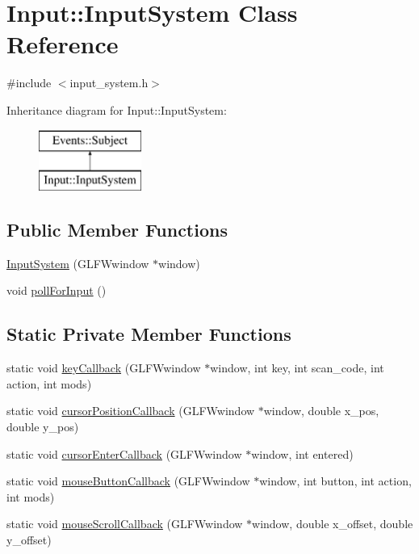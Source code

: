\hypertarget{class_input_1_1_input_system}{}\section{Input\+:\+:Input\+System Class Reference}
\label{class_input_1_1_input_system}


{\ttfamily \#include $<$input\+\_\+system.\+h$>$}

Inheritance diagram for Input\+:\+:Input\+System\+:\begin{figure}[H]
\begin{center}
\leavevmode
\includegraphics[height=2.000000cm]{class_input_1_1_input_system}
\end{center}
\end{figure}
\subsection*{Public Member Functions}
\begin{DoxyCompactItemize}
\item 
\hyperlink{class_input_1_1_input_system_aa754c4c6a976f808004a93dbcfcdb39e}{Input\+System} (G\+L\+F\+Wwindow $\ast$window)
\item 
void \hyperlink{class_input_1_1_input_system_a922d74d9c7b1d58785d58eb8187b90db}{poll\+For\+Input} ()
\end{DoxyCompactItemize}
\subsection*{Static Private Member Functions}
\begin{DoxyCompactItemize}
\item 
static void \hyperlink{class_input_1_1_input_system_a2a53f93797b351082ba88e65a76a59d3}{key\+Callback} (G\+L\+F\+Wwindow $\ast$window, int key, int scan\+\_\+code, int action, int mods)
\item 
static void \hyperlink{class_input_1_1_input_system_a25e317033e1c9932fca9a0f18bafba3e}{cursor\+Position\+Callback} (G\+L\+F\+Wwindow $\ast$window, double x\+\_\+pos, double y\+\_\+pos)
\item 
static void \hyperlink{class_input_1_1_input_system_a418ad9c5aeea37d4700ce108a525168c}{cursor\+Enter\+Callback} (G\+L\+F\+Wwindow $\ast$window, int entered)
\item 
static void \hyperlink{class_input_1_1_input_system_a2d52be441c72bf70dc369c1c075e252d}{mouse\+Button\+Callback} (G\+L\+F\+Wwindow $\ast$window, int button, int action, int mods)
\item 
static void \hyperlink{class_input_1_1_input_system_adcc2296baf82656e5ffbe9aa939163eb}{mouse\+Scroll\+Callback} (G\+L\+F\+Wwindow $\ast$window, double x\+\_\+offset, double y\+\_\+offset)
\end{DoxyCompactItemize}

